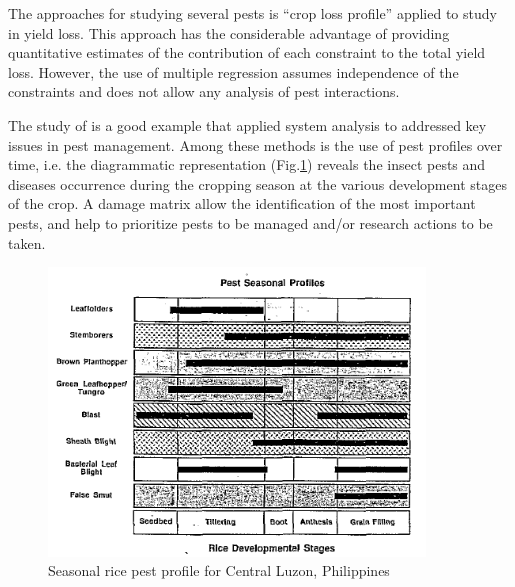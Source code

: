 The approaches for studying several pests is ``crop loss profile'' applied to study in yield loss. This approach has the considerable advantage of providing quantitative estimates of the contribution of each constraint to the total yield loss. However, the use of multiple regression assumes independence of the constraints and does not allow any analysis of pest interactions.

The study of \citet{heong1985systems} is a good example that applied system analysis to addressed key issues in pest management. Among these methods is the use of pest profiles over time, i.e. the diagrammatic representation (Fig.\ref{fig:pest_season_profile}) reveals the insect pests and diseases occurrence during the cropping season at the various development stages of the crop. A damage matrix allow the identification of the most important pests, and help to prioritize pests to be managed and/or research actions to be taken. 

\begin{figure}
\includegraphics[width=10cm]{pest_season_profile}
\centering
\caption{Seasonal rice pest profile for Central Luzon, Philippines \cite{heong1985systems}}
\label{fig:pest_season_profile}
\end{figure}



